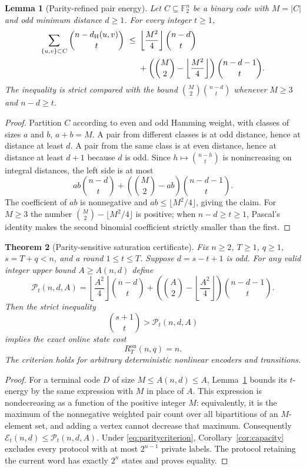 \documentclass[11pt,a4paper]{article}
\newtheorem{theorem}{Theorem}[section]
\newtheorem{lemma}[theorem]{Lemma}
\begin{document}
\begin{lemma}[Parity-refined pair energy]\label{lem:parityenergy}
Let $C\subseteq\mathbb F_2^n$ be a binary code with $M=|C|$ and odd minimum distance $d\ge1$. For every integer $t\ge1$,
\begin{equation}\label{eq:parityenergy}
\begin{split}
\sum_{\{u,v\}\subset C}\binom{n-d_{\rm H}(u,v)}t
\ \le\ &\left\lfloor\frac{M^2}{4}\right\rfloor\binom{n-d}t\\
&+\left(\binom M2-\left\lfloor\frac{M^2}{4}\right\rfloor\right)\binom{n-d-1}t.
\end{split}
\end{equation}
The inequality is strict compared with the bound $\binom M2\binom{n-d}t$ whenever $M\ge3$ and $n-d\ge t$.
\end{lemma}
\begin{proof}
Partition $C$ according to even and odd Hamming weight, with classes of sizes $a$ and $b$, $a+b=M$. A pair from different classes is at odd distance, hence at distance at least $d$. A pair from the same class is at even distance, hence at distance at least $d+1$ because $d$ is odd. Since $h\mapsto\binom{n-h}t$ is nonincreasing on integral distances, the left side is at most
\[
 ab\binom{n-d}t+\left(\binom M2-ab\right)\binom{n-d-1}t.
\]
The coefficient of $ab$ is nonnegative and $ab\le\lfloor M^2/4\rfloor$, giving the claim. For $M\ge3$ the number $\binom M2-\lfloor M^2/4\rfloor$ is positive; when $n-d\ge t\ge1$, Pascal's identity makes the second binomial coefficient strictly smaller than the first.
\end{proof}

\begin{theorem}[Parity-sensitive saturation certificate]\label{thm:paritysat}
Fix $n\ge2$, $T\ge1$, $q\ge1$, $s=T+q<n$, and a round $1\le t\le T$. Suppose $d=s-t+1$ is odd. For any valid integer upper bound $A\ge A(n,d)$ define
\[
 \mathcal P_t(n,d,A)=\left\lfloor\frac{A^2}{4}\right\rfloor\binom{n-d}t+
 \left(\binom A2-\left\lfloor\frac{A^2}{4}\right\rfloor\right)\binom{n-d-1}t.
\]
Then the strict inequality
\begin{equation}\label{eq:paritycriterion}
\boxed{\quad\binom{s+1}t>\mathcal P_t(n,d,A)\quad}
\end{equation}
implies the exact online state cost
\[
\boxed{R_T^{\mathrm{on}}(n,q)=n.}
\]
The criterion holds for arbitrary deterministic nonlinear encoders and transitions.
\end{theorem}
\begin{proof}
For a terminal code $D$ of size $M\le A(n,d)\le A$, Lemma~\ref{lem:parityenergy} bounds its $t$-energy by the same expression with $M$ in place of $A$. This expression is nondecreasing as a function of the positive integer $M$: equivalently, it is the maximum of the nonnegative weighted pair count over all bipartitions of an $M$-element set, and adding a vertex cannot decrease that maximum. Consequently $\mathcal E_t(n,d)\le\mathcal P_t(n,d,A)$. Under \eqref{eq:paritycriterion}, Corollary~\ref{cor:capacity} excludes every protocol with at most $2^{n-1}$ private labels. The protocol retaining the current word has exactly $2^n$ states and proves equality.
\end{proof}
\end{document}
